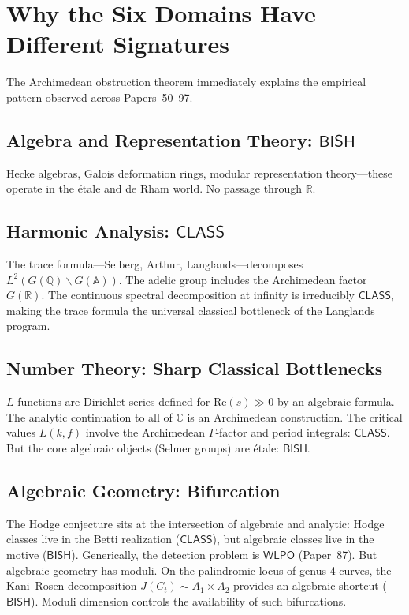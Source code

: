 \documentclass[11pt,a4paper]{article}
\theoremstyle{plain}
\theoremstyle{definition}
\newcommand{\BISH}{\textsf{BISH}}
\newcommand{\WLPO}{\textsf{WLPO}}
\newcommand{\CLASS}{\textsf{CLASS}}
\newcommand{\Q}{\mathbb{Q}}
\newcommand{\R}{\mathbb{R}}
\newcommand{\C}{\mathbb{C}}
\newcommand{\A}{\mathbb{A}}
\begin{document}
\section{Why the Six Domains Have Different Signatures}\label{sec:sixdomains}

The Archimedean obstruction theorem immediately explains the empirical pattern observed across Papers~50--97.

\subsection{Algebra and Representation Theory: $\BISH$}

Hecke algebras, Galois deformation rings, modular representation theory---these operate in the \'etale and de Rham world. No passage through $\R$. 

\subsection{Harmonic Analysis: $\CLASS$}

The trace formula---Selberg, Arthur, Langlands---decomposes $L^2(G(\Q)\backslash G(\A))$. The adelic group includes the Archimedean factor $G(\R)$. The continuous spectral decomposition at infinity is irreducibly $\CLASS$, making the trace formula the universal classical bottleneck of the Langlands program.

\subsection{Number Theory: Sharp Classical Bottlenecks}

$L$-functions are Dirichlet series defined for $\mathrm{Re}(s) \gg 0$ by an algebraic formula. The analytic continuation to all of $\C$ is an Archimedean construction. The critical values $L(k, f)$ involve the Archimedean $\Gamma$-factor and period integrals: $\CLASS$. But the core algebraic objects (Selmer groups) are \'etale: $\BISH$. 

\subsection{Algebraic Geometry: Bifurcation}

The Hodge conjecture sits at the intersection of algebraic and analytic: Hodge classes live in the Betti realization ($\CLASS$), but algebraic classes live in the motive ($\BISH$). Generically, the detection problem is $\WLPO$ (Paper~87). But algebraic geometry has moduli. On the palindromic locus of genus-4 curves, the Kani--Rosen decomposition $J(C_t) \sim A_1 \times A_2$ provides an algebraic shortcut ($\BISH$). Moduli dimension controls the availability of such bifurcations.
\end{document}
